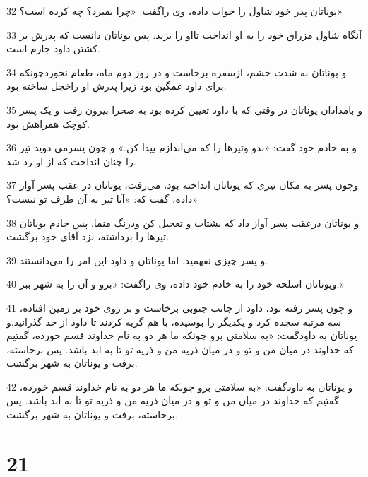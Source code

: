 \par 32 یوناتان پدر خود شاول را جواب داده، وی راگفت: «چرا بمیرد؟ چه کرده است؟»
\par 33 آنگاه شاول مزراق خود را به او انداخت تااو را بزند. پس یوناتان دانست که پدرش بر کشتن داود جازم است.
\par 34 و یوناتان به شدت خشم، ازسفره برخاست و در روز دوم ماه، طعام نخوردچونکه برای داود غمگین بود زیرا پدرش او راخجل ساخته بود.
\par 35 و بامدادان یوناتان در وقتی که با داود تعیین کرده بود به صحرا بیرون رفت و یک پسر کوچک همراهش بود.
\par 36 و به خادم خود گفت: «بدو وتیرها را که می‌اندازم پیدا کن.» و چون پسرمی دوید تیر را چنان انداخت که از او رد شد.
\par 37 وچون پسر به مکان تیری که یوناتان انداخته بود، می‌رفت، یوناتان در عقب پسر آواز داده، گفت که: «آیا تیر به آن طرف تو نیست؟»
\par 38 و یوناتان درعقب پسر آواز داد که بشتاب و تعجیل کن ودرنگ منما. پس خادم یوناتان تیرها را برداشته، نزد آقای خود برگشت.
\par 39 و پسر چیزی نفهمید. اما یوناتان و داود این امر را می‌دانستند.
\par 40 ویوناتان اسلحه خود را به خادم خود داده، وی راگفت: «برو و آن را به شهر ببر.»
\par 41 و چون پسر رفته بود، داود از جانب جنوبی برخاست و بر روی خود بر زمین افتاده، سه مرتبه سجده کرد و یکدیگر را بوسیده، با هم گریه کردند تا داود از حد گذرانید.و یوناتان به داودگفت: «به سلامتی برو چونکه ما هر دو به نام خداوند قسم خورده، گفتیم که خداوند در میان من و تو و در میان ذریه من و ذریه تو تا به ابد باشد. پس برخاسته، برفت و یوناتان به شهر برگشت.
\par 42 و یوناتان به داودگفت: «به سلامتی برو چونکه ما هر دو به نام خداوند قسم خورده، گفتیم که خداوند در میان من و تو و در میان ذریه من و ذریه تو تا به ابد باشد. پس برخاسته، برفت و یوناتان به شهر برگشت.
 
\chapter{21}

